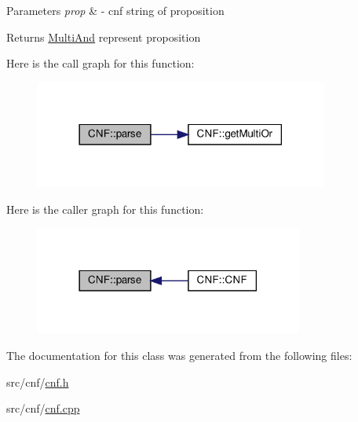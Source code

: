 \begin{DoxyParams}{Parameters}
{\em prop} & -\/ cnf string of proposition \\
\hline
\end{DoxyParams}
\begin{DoxyReturn}{Returns}
\hyperlink{class_multi_and}{Multi\+And} represent proposition 
\end{DoxyReturn}
Here is the call graph for this function\+:\nopagebreak
\begin{figure}[H]
\begin{center}
\leavevmode
\includegraphics[width=273pt]{dc/d0e/class_c_n_f_a5232071e600e1bfbb76ad7d0e10d7d92_cgraph}
\end{center}
\end{figure}
Here is the caller graph for this function\+:\nopagebreak
\begin{figure}[H]
\begin{center}
\leavevmode
\includegraphics[width=249pt]{dc/d0e/class_c_n_f_a5232071e600e1bfbb76ad7d0e10d7d92_icgraph}
\end{center}
\end{figure}


The documentation for this class was generated from the following files\+:\begin{DoxyCompactItemize}
\item 
src/cnf/\hyperlink{cnf_8h}{cnf.\+h}\item 
src/cnf/\hyperlink{cnf_8cpp}{cnf.\+cpp}\end{DoxyCompactItemize}
